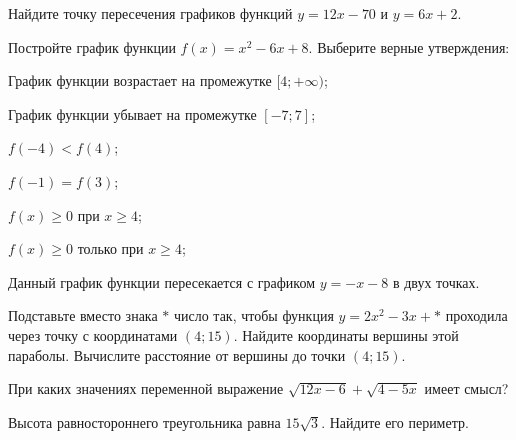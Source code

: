 %
%
\begin{class}[number=2]
	\begin{listofex}
		\item Найдите точку пересечения графиков функций \( y=12x-70 \) и \( y=6x+2 \).
		\item Постройте график функции \( f(x)=x^2-6x+8 \). Выберите верные утверждения:
		\begin{enumcols}[itemcolumns=1]
			\item График функции возрастает на промежутке \( [4;+\infty) \);
			\item График функции убывает на промежутке \( [-7;7] \);
			\item \( f(-4)<f(4) \);
			\item \( f(-1)=f(3) \);
			\item \( f(x)\ge0 \) при \( x\ge4 \);
			\item \( f(x)\ge0 \) только при \( x\ge4 \);
			\item Данный график функции пересекается с графиком \( y=-x-8 \) в двух точках.
		\end{enumcols}
		\item Подставьте вместо знака \( * \) число так, чтобы функция \( y=2x^2-3x+* \) проходила через точку с координатами \( (4;15) \). Найдите координаты вершины этой параболы. Вычислите расстояние от вершины до точки \( (4;15) \).
		


		\item При каких значениях переменной выражение \( \sqrt{12x-6}+\sqrt{4-5x} \) имеет смысл?
		\item {}
		\item {}
		\item {}
		\item Высота равностороннего треугольника равна \( 15\sqrt{3} \). Найдите его периметр.
	\end{listofex}
\end{class}
